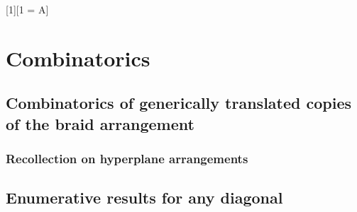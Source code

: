 
[1][1 = A]{} %

\section{Combinatorics}

\subsection{Combinatorics of generically translated copies of the braid arrangement}
\label{sec:kBraidArrangement}

\subsubsection{Recollection on hyperplane arrangements}
\label{subsec:arrangements}

%
%


\subsection{Enumerative results for any diagonal} 
\label{s:facets}

